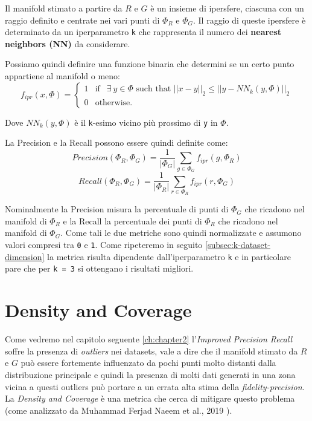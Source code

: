 Il manifold stimato a partire da \(R\) e \(G\) è un insieme di ipersfere, ciascuna con un raggio definito e centrate nei vari punti di \(\Phi_R\) e \(\Phi_G\). Il raggio di queste ipersfere è 
determinato da un iperparametro \texttt{k} che rappresenta il numero dei \textbf{nearest neighbors (NN)} da considerare. 

Possiamo quindi definire una funzione binaria che determini se un certo punto appartiene al manifold o meno:
\begin{equation}
    \label{eq:f-ipr}
    f_{ipr}(x, \Phi) = 
    \begin{cases}
        1 & \text{if }~~ \exists ~ y \in \Phi \text{ such that } ||x - y||_2 \leq ||y - NN_k(y, \Phi)||_2 \\
        0 & \text{otherwise.}
    \end{cases}
\end{equation}

Dove \(NN_k(y, \Phi)\) è il \texttt{k}-esimo vicino più prossimo di \texttt{y} in \(\Phi\).

La Precision e la Recall possono essere quindi definite come:
\begin{equation}
    Precision(\Phi_R, \Phi_G) = \frac{1}{|\Phi_G|} \sum_{g \in \Phi_G} f_{ipr}(g, \Phi_R)
\end{equation}
\begin{equation}
    Recall(\Phi_R, \Phi_G) = \frac{1}{|\Phi_R|} \sum_{r \in \Phi_R} f_{ipr}(r, \Phi_G)
\end{equation}

Nominalmente la Precision misura la percentuale di punti di \(\Phi_G\) che ricadono nel manifold di \(\Phi_R\) e la Recall la percentuale dei punti di \(\Phi_R\) che ricadono nel manifold di \(\Phi_G\).
Come tali le due metriche sono quindi normalizzate e assumono valori compresi tra \texttt{0} e \texttt{1}.
Come ripeteremo in seguito \ref{subsec:k-dataset-dimension} la metrica risulta dipendente dall'iperparametro \texttt{k} e in particolare pare che per \texttt{k = 3} si ottengano i risultati migliori.

\section{Density and Coverage}
\label{sec:density-and-coverage}

Come vedremo nel capitolo seguente \ref{ch:chapter2} l'\textit{Improved Precision Recall} soffre la presenza di \textit{outliers} nei datasets, vale a dire che il manifold stimato da \(R\) e \(G\) può essere fortemente influenzato da pochi punti molto distanti dalla distribuzione principale e quindi la presenza di molti dati generati in una zona vicina a questi outliers può portare a un errata alta stima della \textit{fidelity-precision}.
La \textit{Density and Coverage} è una metrica che cerca di mitigare questo problema (come analizzato da Muhammad Ferjad Naeem et al., 2019 \cite{3ReliableFidelityDiversityMetrics}). 

